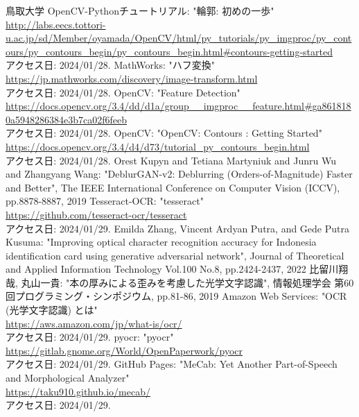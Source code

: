 \documentclass[uplatex, report, a4j, 10pt]{jsbook}
\begin{document}
\begin{thebibliography}{0}
  鳥取大学 OpenCV-Pythonチュートリアル: "輪郭: 初めの一歩"\\\url{http://labs.eecs.tottori-u.ac.jp/sd/Member/oyamada/OpenCV/html/py_tutorials/py_imgproc/py_contours/py_contours_begin/py_contours_begin.html#contours-getting-started}\\アクセス日: 2024/01/28.
  MathWorks: "ハフ変換"\\\url{https://jp.mathworks.com/discovery/image-transform.html}\\アクセス日: 2024/01/28.
  OpenCV: "Feature Detection"\\\url{https://docs.opencv.org/3.4/dd/d1a/group__imgproc__feature.html#ga8618180a5948286384e3b7ca02f6feeb}\\アクセス日: 2024/01/28.
  OpenCV: "OpenCV: Contours : Getting Started"\\\url{https://docs.opencv.org/3.4/d4/d73/tutorial_py_contours_begin.html}\\アクセス日: 2024/01/28.
  Orest Kupyn and Tetiana Martyniuk and Junru Wu and Zhangyang Wang: "DeblurGAN-v2: Deblurring (Orders-of-Magnitude) Faster and Better", The IEEE International Conference on Computer Vision (ICCV), pp.8878-8887, 2019
  Tesseract-OCR: "tesseract"\\\url{https://github.com/tesseract-ocr/tesseract}\\アクセス日: 2024/01/29.
  Emilda Zhang,  Vincent Ardyan Putra, and Gede Putra Kusuma: "Improving optical character recognition accuracy for Indonesia identification card using generative adversarial network", Journal of Theoretical and Applied Information Technology Vol.100 No.8, pp.2424-2437, 2022
  比留川翔哉, 丸山一貴: "本の厚みによる歪みを考慮した光学文字認識", 情報処理学会 第60回プログラミング・シンポジウム, pp.81-86, 2019
  Amazon Web Services: "OCR (光学文字認識) とは"\\\url{https://aws.amazon.com/jp/what-is/ocr/}\\アクセス日: 2024/01/29.
  pyocr: "pyocr"\\\url{https://gitlab.gnome.org/World/OpenPaperwork/pyocr}\\アクセス日: 2024/01/29.
  GitHub Pages: "MeCab: Yet Another Part-of-Speech and Morphological Analyzer"\\\url{https://taku910.github.io/mecab/}\\アクセス日: 2024/01/29.

\end{thebibliography}
\end{document}
